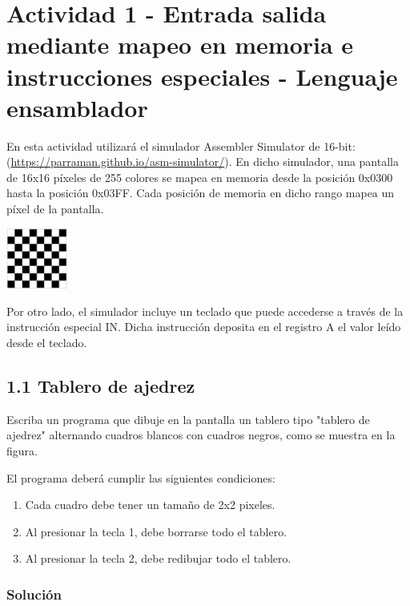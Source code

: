 \documentclass{article}
\begin{document}

\section*{Actividad 1 - Entrada salida mediante mapeo en memoria e instrucciones especiales - Lenguaje ensamblador}

En esta actividad utilizará el simulador Assembler Simulator de 16-bit: (\url{https://parraman.github.io/asm-simulator/}). En dicho simulador, una pantalla de 16x16 píxeles de 255 colores se mapea en memoria desde la posición 0x0300 hasta la posición 0x03FF. Cada posición de memoria en dicho rango mapea un píxel de la pantalla.

\begin{center}
    \includegraphics*[width=76px]{./img/ej1.1.png}
\end{center}

Por otro lado, el simulador incluye un teclado que puede accederse a través de la instrucción especial IN. Dicha instrucción deposita en el registro A el valor leído desde el teclado.

\subsection*{1.1 Tablero de ajedrez}

Escriba un programa que dibuje en la pantalla un tablero tipo "tablero de ajedrez" alternando cuadros blancos con cuadros negros, como se muestra en la figura.

El programa deberá cumplir las siguientes condiciones:

\begin{enumerate}[label=\alph*)]
    \item Cada cuadro debe tener un tamaño de 2x2 pixeles.
    \item Al presionar la tecla 1, debe borrarse todo el tablero.
    \item Al presionar la tecla 2, debe redibujar todo el tablero.
\end{enumerate}

\subsubsection*{Solución}
\end{document}
